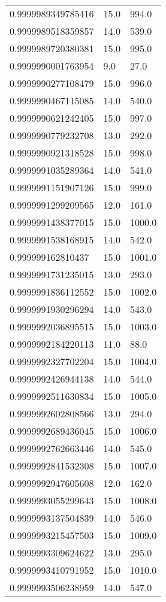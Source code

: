 \begin{center}
\begin{supertabular}[H]{p{0.30\textwidth}p{0.05\textwidth}p{0.05\textwidth}}
0.9999989349785416 & 15.0 & 994.0 \\ 
0.9999989518359857 & 14.0 & 539.0 \\ 
0.9999989720380381 & 15.0 & 995.0 \\ 
0.9999990001763954 & 9.0 & 27.0 \\ 
0.9999990277108479 & 15.0 & 996.0 \\ 
0.9999990467115085 & 14.0 & 540.0 \\ 
0.9999990621242405 & 15.0 & 997.0 \\ 
0.9999990779232708 & 13.0 & 292.0 \\ 
0.9999990921318528 & 15.0 & 998.0 \\ 
0.9999991035289364 & 14.0 & 541.0 \\ 
0.9999991151907126 & 15.0 & 999.0 \\ 
0.9999991299209565 & 12.0 & 161.0 \\ 
0.9999991438377015 & 15.0 & 1000.0 \\ 
0.9999991538168915 & 14.0 & 542.0 \\ 
0.999999162810437 & 15.0 & 1001.0 \\ 
0.9999991731235015 & 13.0 & 293.0 \\ 
0.9999991836112552 & 15.0 & 1002.0 \\ 
0.9999991930296294 & 14.0 & 543.0 \\ 
0.9999992036895515 & 15.0 & 1003.0 \\ 
0.9999992184220113 & 11.0 & 88.0 \\ 
0.9999992327702204 & 15.0 & 1004.0 \\ 
0.9999992426944138 & 14.0 & 544.0 \\ 
0.9999992511630834 & 15.0 & 1005.0 \\ 
0.9999992602808566 & 13.0 & 294.0 \\ 
0.9999992689436045 & 15.0 & 1006.0 \\ 
0.9999992762663446 & 14.0 & 545.0 \\ 
0.9999992841532308 & 15.0 & 1007.0 \\ 
0.9999992947605608 & 12.0 & 162.0 \\ 
0.9999993055299643 & 15.0 & 1008.0 \\ 
0.9999993137504839 & 14.0 & 546.0 \\ 
0.9999993215457503 & 15.0 & 1009.0 \\ 
0.9999993309624622 & 13.0 & 295.0 \\ 
0.9999993410791952 & 15.0 & 1010.0 \\ 
0.9999993506238959 & 14.0 & 547.0 \\ 

\end{supertabular}
\end{center}
